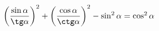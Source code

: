 \begin{ex}[type=prove_identity]
	\begin{condition}
		\( \left( \dfrac{\sin\alpha}{\tg\alpha} \right)^2+\left( \dfrac{\cos\alpha}{\ctg\alpha} \right)^2-\sin^2\alpha=\cos^2\alpha \)
	\end{condition}
\end{ex}